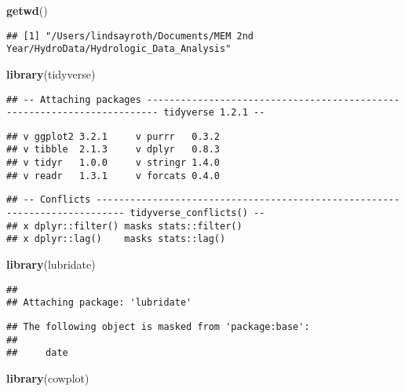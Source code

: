\documentclass[]{article}
\newenvironment{Shaded}{\begin{snugshade}}{\end{snugshade}}
\newcommand{\KeywordTok}[1]{\textcolor[rgb]{0.13,0.29,0.53}{\textbf{#1}}}
\newcommand{\NormalTok}[1]{#1}
\begin{document}
\begin{Shaded}
\begin{Highlighting}[]
\KeywordTok{getwd}\NormalTok{()}
\end{Highlighting}
\end{Shaded}

\begin{verbatim}
## [1] "/Users/lindsayroth/Documents/MEM 2nd Year/HydroData/Hydrologic_Data_Analysis"
\end{verbatim}

\begin{Shaded}
\begin{Highlighting}[]
\KeywordTok{library}\NormalTok{(tidyverse)}
\end{Highlighting}
\end{Shaded}

\begin{verbatim}
## -- Attaching packages ------------------------------------------------------------------------ tidyverse 1.2.1 --
\end{verbatim}

\begin{verbatim}
## v ggplot2 3.2.1     v purrr   0.3.2
## v tibble  2.1.3     v dplyr   0.8.3
## v tidyr   1.0.0     v stringr 1.4.0
## v readr   1.3.1     v forcats 0.4.0
\end{verbatim}

\begin{verbatim}
## -- Conflicts --------------------------------------------------------------------------- tidyverse_conflicts() --
## x dplyr::filter() masks stats::filter()
## x dplyr::lag()    masks stats::lag()
\end{verbatim}

\begin{Shaded}
\begin{Highlighting}[]
\KeywordTok{library}\NormalTok{(lubridate)}
\end{Highlighting}
\end{Shaded}

\begin{verbatim}
## 
## Attaching package: 'lubridate'
\end{verbatim}

\begin{verbatim}
## The following object is masked from 'package:base':
## 
##     date
\end{verbatim}

\begin{Shaded}
\begin{Highlighting}[]
\KeywordTok{library}\NormalTok{(cowplot)}
\end{Highlighting}
\end{Shaded}
\end{document}
